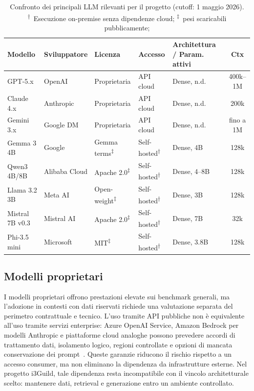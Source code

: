 \begin{table}[ht]
  \centering
  \caption{Confronto dei principali LLM rilevanti per il progetto
    (cutoff: 1 maggio 2026). \textsuperscript{†}~Esecuzione on-premise senza
    dipendenze cloud; \textsuperscript{‡}~pesi scaricabili pubblicamente;}
  \label{tab:llm_comparison}
  \small
  \begin{tabular}{llllp{2.4cm}c}
    \toprule
    \textbf{Modello} & \textbf{Sviluppatore} & \textbf{Licenza}
      & \textbf{Accesso} & \textbf{Architettura / Param. attivi}
      & \textbf{Ctx} \\
    \midrule
    GPT-5.x          & OpenAI        & Proprietaria  & API cloud
      & Dense, n.d.          & 400k--1M   \\
    Claude 4.x       & Anthropic     & Proprietaria  & API cloud
      & Dense, n.d.          & 200k       \\
    Gemini 3.x       & Google DM     & Proprietaria  & API cloud
      & Dense, n.d.          & fino a 1M  \\
    \midrule
    Gemma 3 4B       & Google        & Gemma terms\textsuperscript{‡}
      & Self-hosted\textsuperscript{†} & Dense, 4B & 128k  \\
    Qwen3 4B/8B      & Alibaba Cloud & Apache 2.0\textsuperscript{‡}
      & Self-hosted\textsuperscript{†} & Dense, 4--8B & 128k  \\
    Llama 3.2 3B     & Meta AI       & Open-weight\textsuperscript{‡}
      & Self-hosted\textsuperscript{†} & Dense, 3B & 128k  \\
    Mistral 7B v0.3  & Mistral AI    & Apache 2.0\textsuperscript{‡}
      & Self-hosted\textsuperscript{†} & Dense, 7B & 32k  \\
    Phi-3.5 mini     & Microsoft     & MIT\textsuperscript{‡}
      & Self-hosted\textsuperscript{†} & Dense, 3.8B & 128k  \\
    \bottomrule
  \end{tabular}
\end{table}

\subsection{Modelli proprietari}

I modelli proprietari offrono prestazioni elevate sui benchmark generali, ma
l'adozione in contesti con dati riservati richiede una valutazione separata del
perimetro contrattuale e tecnico. L'uso tramite API pubbliche non è equivalente
all'uso tramite servizi enterprise: Azure OpenAI Service, Amazon Bedrock per
modelli Anthropic e piattaforme cloud analoghe possono prevedere accordi di
trattamento dati, isolamento logico, regioni controllate e opzioni di mancata
conservazione dei prompt~\cite{openaiModels2026,anthropicModels2026}. Queste
garanzie riducono il rischio rispetto a un accesso consumer, ma non eliminano
la dipendenza da infrastrutture esterne. Nel progetto i3Guild, tale dipendenza
resta incompatibile con il vincolo architetturale scelto: mantenere dati,
retrieval e generazione entro un ambiente controllato.

